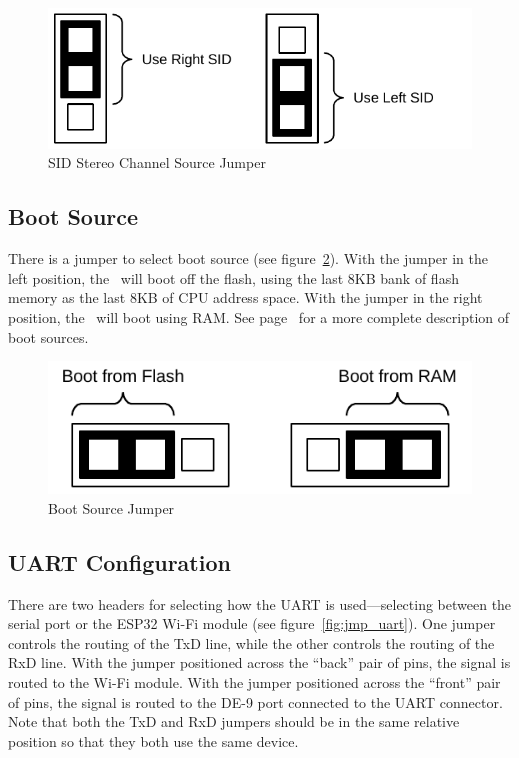 \begin{figure}[ht]
    \begin{center}
        \includegraphics[scale=0.65]{images/jumper_channel.pdf}
    \end{center}
    \caption{SID Stereo Channel Source Jumper}
    \label{fig:jmp_sid_channel}
\end{figure}

\subsection*{Boot Source}

There is a jumper to select boot source (see figure~\ref{fig:jmp_boot}). With the jumper in the left position, the \fjr\ will boot off the flash, using the last 8KB bank of flash memory as the last 8KB of CPU address space. With the jumper in the right position, the \fjr\ will boot using RAM. See page~\pageref{pg:mmu_boot_config} for a more complete description of boot sources.

\begin{figure}[ht]
    \begin{center}
        \includegraphics[scale=0.65]{images/jumper_boot.pdf}
    \end{center}
    \caption{Boot Source Jumper}
    \label{fig:jmp_boot}
\end{figure}

\subsection*{UART Configuration}

There are two headers for selecting how the UART is used---selecting between the serial port or the ESP32 Wi-Fi module (see figure~\ref{fig:jmp_uart}). One jumper controls the routing of the TxD line, while the other controls the routing of the RxD line. With the jumper positioned across the ``back'' pair of pins, the signal is routed to the Wi-Fi module. With the jumper positioned across the ``front'' pair of pins, the signal is routed to the DE-9 port connected to the UART connector. Note that both the TxD and RxD jumpers should be in the same relative position so that they both use the same device.

